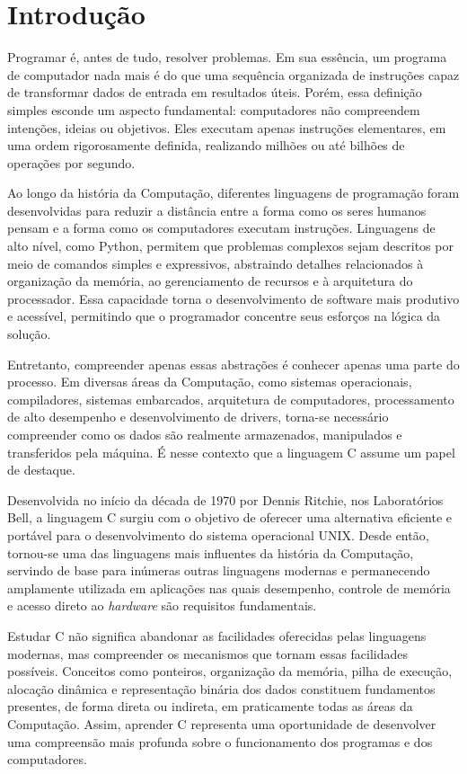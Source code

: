 \chapter{Introdução}

Programar é, antes de tudo, resolver problemas. Em sua essência, um programa de computador nada mais é do que uma sequência organizada de instruções capaz de transformar dados de entrada em resultados úteis. 
Porém, essa definição simples esconde um aspecto fundamental: computadores não compreendem intenções, ideias ou objetivos.
Eles executam apenas instruções elementares, em uma ordem rigorosamente definida, realizando milhões ou até bilhões de operações por segundo.

Ao longo da história da Computação, diferentes linguagens de programação foram desenvolvidas para reduzir a distância entre a forma como os seres humanos pensam e a forma como os computadores executam instruções. 
Linguagens de alto nível, como Python, permitem que problemas complexos sejam descritos por meio de comandos simples e expressivos, 
abstraindo detalhes relacionados à organização da memória, ao gerenciamento de recursos e à arquitetura do processador. 
Essa capacidade torna o desenvolvimento de software mais produtivo e acessível, permitindo que o programador concentre seus esforços na lógica da solução.

Entretanto, compreender apenas essas abstrações é conhecer apenas uma parte do processo. Em diversas áreas da Computação, como sistemas operacionais, compiladores, sistemas embarcados, 
arquitetura de computadores, processamento de alto desempenho e desenvolvimento de drivers, torna-se necessário compreender como os dados são realmente armazenados, manipulados e transferidos pela máquina. 
É nesse contexto que a linguagem C assume um papel de destaque.

Desenvolvida no início da década de 1970 por Dennis Ritchie, nos Laboratórios Bell, a linguagem C surgiu com o objetivo de oferecer uma alternativa eficiente e portável para o desenvolvimento do sistema operacional UNIX. 
Desde então, tornou-se uma das linguagens mais influentes da história da Computação, servindo de base para inúmeras outras linguagens modernas e 
permanecendo amplamente utilizada em aplicações nas quais desempenho, controle de memória e acesso direto ao \textit{hardware} são requisitos fundamentais.

Estudar C não significa abandonar as facilidades oferecidas pelas linguagens modernas, mas compreender os mecanismos que tornam essas facilidades possíveis. 
Conceitos como ponteiros, organização da memória, pilha de execução, alocação dinâmica e 
representação binária dos dados constituem fundamentos presentes, de forma direta ou indireta, em praticamente todas as áreas da Computação. 
Assim, aprender C representa uma oportunidade de desenvolver uma compreensão mais profunda sobre o funcionamento dos programas e dos computadores.

